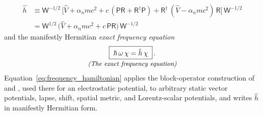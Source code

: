 \documentclass[aps,prd,onecolumn,tightenlines,nofootinbib,notitlepage,11pt,floatfix]{revtex4-2}
\theoremstyle{indentedtheorem}
\begin{document}
\begin{align}
    \hat{h} &\equiv \mathsf{W}^{-1/2}\,\big[\hat{V} + \alpha_nmc^2 + c\,(\mathsf{P}\mathsf{R}+\mathsf{R}^\dagger\mathsf{P}) + \mathsf{R}^\dagger\,(\hat{V}-\alpha_nmc^2)\,\mathsf{R}\big]\,\mathsf{W}^{-1/2} \label{eq:frequency_hamiltonian} \\
    &= \mathsf{W}^{1/2}\,\big(\hat{V} + \alpha_nmc^2 + c\,\mathsf{P}\mathsf{R}\big)\,\mathsf{W}^{-1/2} \label{eq:similarity}
\end{align}
and the manifestly Hermitian \emph{exact frequency equation}
\begin{equation}
    \begin{gathered}
    \boxed{\; \hbar\,\omega \, \chi = \hat{h} \, \chi \;} \, . \\[-3pt]
    \text{\small\itshape (The exact frequency equation)}
    \end{gathered}
    \label{eq:frequency_operator}
\end{equation}
Equation~\eqref{eq:frequency_hamiltonian} applies the block-operator construction of \citet{Heully1986Diagonalisation} and \citet{KutzelniggLiu2005Quasirelativistic}, used there for an electrostatic potential, to arbitrary static vector potentials, lapse, shift, spatial metric, and Lorentz-scalar potentials, and writes $\hat{h}$ in manifestly Hermitian form.
\end{document}
